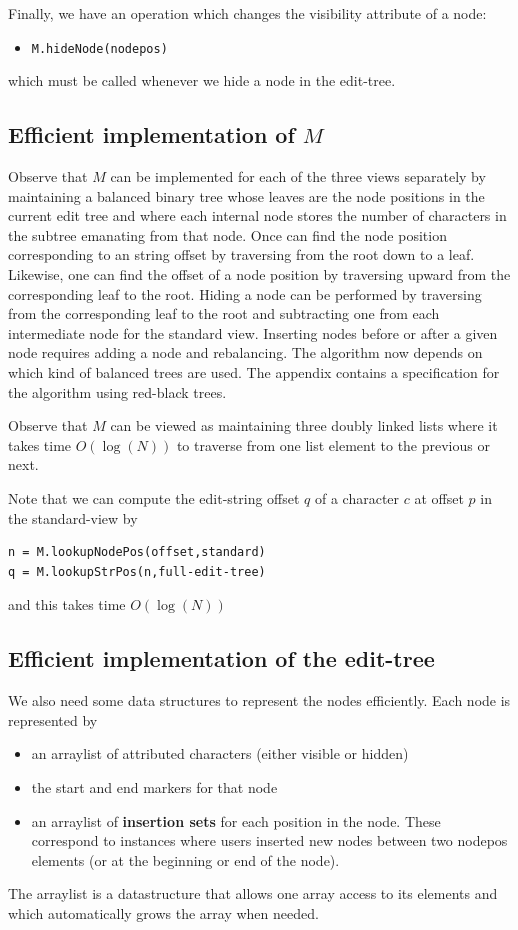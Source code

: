 \documentclass{amsart}
\begin{document}
Finally, we have an operation which changes the visibility attribute of a node:
\begin{itemize}

\item {\tt M.hideNode(nodepos)}

\end{itemize}
which must be called whenever we hide a node in the edit-tree.


\subsection{Efficient implementation of $M$}
Observe that $M$ can be implemented for each of the three views separately
by maintaining a balanced binary tree whose leaves are the node positions
in the current edit tree and where each internal node stores the number
of characters in the subtree emanating from that node. Once can find the
node position corresponding to an string offset by traversing from the root
down to a leaf. Likewise, one can find the offset of a node position by traversing
upward from the corresponding leaf to the root. Hiding a node can be performed
by traversing from the corresponding leaf to the root and subtracting one
from each intermediate node for the standard view. Inserting nodes before
or after a given node requires adding a node and rebalancing. The algorithm
now depends on which kind of balanced trees are used. The appendix contains
a specification for the algorithm using red-black trees.

Observe that $M$ can be viewed as maintaining three doubly linked lists
where it takes time $O(\log(N))$ to traverse from one list element to the
previous or next.

Note that we can compute the edit-string offset $q$ of a character
$c$ at offset $p$ in the standard-view by
\begin{verbatim}
n = M.lookupNodePos(offset,standard)
q = M.lookupStrPos(n,full-edit-tree)
\end{verbatim}
and this takes time $O(\log(N))$

\subsection{Efficient implementation of the edit-tree}

We also need some data structures to represent the nodes efficiently.
Each node is represented by 
\begin{itemize}
\item an arraylist of attributed characters (either visible or hidden)
\item the start and end markers for that node
\item an arraylist of {\bf insertion sets} for each position in the node. These correspond
to instances where users inserted new nodes between two nodepos elements (or at
the beginning or end of the node).
\end{itemize}
The arraylist is a datastructure that allows one array access to its elements
and which automatically grows the array when needed.
\end{document}
